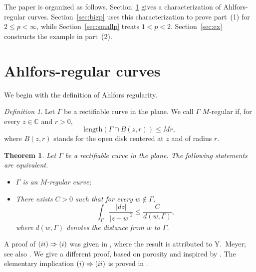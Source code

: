 \documentclass[11pt]{article}
\numberwithin{equation}{section}
\newtheorem{theorem}{Theorem}
\theoremstyle{remark}
\newtheorem*{definition}{Definition}
\begin{document}


The paper is organized as follows. 
Section~\ref{sec:Ar} gives a characterization of Ahlfors-regular curves.  
Section~\ref{sec:bigp} uses this characterization to prove part~\rm{(1)} for $2\le p<\infty$, while Section~\ref{sec:smallp} treats $1<p<2$.  Section~\ref{sec:ex} constructs 
the example in part~\rm{(2)}.







\section{Ahlfors-regular curves}\label{sec:Ar}
 We begin with the definition of Ahlfors regularity.
\begin{definition} 
Let $\Gamma$ be a rectifiable curve in the plane.  We call $\Gamma$
$M$-regular if, for every $z\in\mathbb C$ and $r>0$,
$$\mathrm{length}(\Gamma\cap B(z,r))\leq Mr,$$
where $B(z, r)$ stands for the open disk centered at $z$ and of radius $r$. 
\end{definition}

\begin{theorem}\label{imp}
    Let $\Gamma$ be a rectifiable curve in the plane.  The following
    statements are equivalent.
\begin{itemize}
    \item[{\rm(i)}] $\Gamma$ is an $M$-regular curve; 
    \item[{\rm(ii)}] There exists $C>0$ such that for every $w\notin \Gamma$,
$$\int_{\Gamma}\frac{|dz|}{|z - w|^2}  \leq \frac{C}{d(w,\Gamma)},$$
where $d(w,\Gamma)$ denotes the distance from $w$ to $\Gamma$.
\end{itemize}
\end{theorem}
\noindent A proof of $\rm(ii)\Rightarrow\rm(i)$ was given in
\cite{zin}, where the result is attributed to Y.~Meyer; see also \cite{WZ}.
We give a different proof, based on porosity and inspired by \cite{bru}.
The elementary implication $\rm(i)\Rightarrow\rm(ii)$ is proved in
\cite{WZ,bru}.
\end{document}
